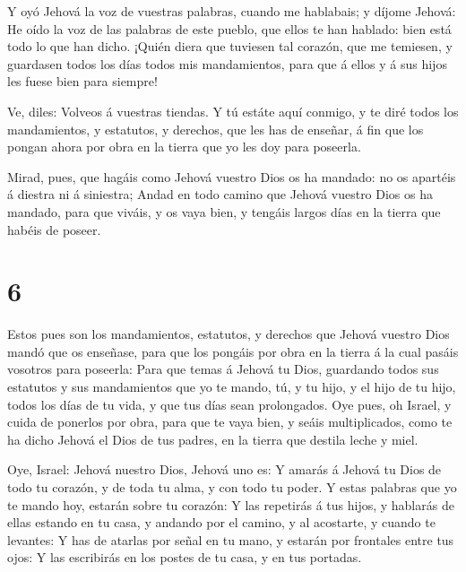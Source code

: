  Y oyó Jehová la voz de vuestras palabras, cuando me
hablabais; y díjome Jehová: He oído la voz de las palabras de este
pueblo, que ellos te han hablado: bien está todo lo que han dicho.
 ¡Quién diera que tuviesen tal corazón, que me temiesen, y
guardasen todos los días todos mis mandamientos, para que á ellos y á
sus hijos les fuese bien para siempre!

 Ve, diles: Volveos á vuestras tiendas.  Y tú
estáte aquí conmigo, y te diré todos los mandamientos, y estatutos, y
derechos, que les has de enseñar, á fin que los pongan ahora por obra en
la tierra que yo les doy para poseerla.

 Mirad, pues, que hagáis como Jehová vuestro Dios os ha
mandado: no os apartéis á diestra ni á siniestra;  Andad en
todo camino que Jehová vuestro Dios os ha mandado, para que viváis, y os
vaya bien, y tengáis largos días en la tierra que habéis de poseer.

\hypertarget{section-5}{%
\section{6}\label{section-5}}

 Estos pues son los mandamientos, estatutos, y derechos que
Jehová vuestro Dios mandó que os enseñase, para que los pongáis por obra
en la tierra á la cual pasáis vosotros para poseerla:  Para
que temas á Jehová tu Dios, guardando todos sus estatutos y sus
mandamientos que yo te mando, tú, y tu hijo, y el hijo de tu hijo, todos
los días de tu vida, y que tus días sean prolongados.  Oye
pues, oh Israel, y cuida de ponerlos por obra, para que te vaya bien, y
seáis multiplicados, como te ha dicho Jehová el Dios de tus padres, en
la tierra que destila leche y miel.

 Oye, Israel: Jehová nuestro Dios, Jehová uno es:
 Y amarás á Jehová tu Dios de todo tu corazón, y de toda tu
alma, y con todo tu poder.  Y estas palabras que yo te mando
hoy, estarán sobre tu corazón:  Y las repetirás á tus hijos,
y hablarás de ellas estando en tu casa, y andando por el camino, y al
acostarte, y cuando te levantes:  Y has de atarlas por señal
en tu mano, y estarán por frontales entre tus ojos:  Y las
escribirás en los postes de tu casa, y en tus portadas.


